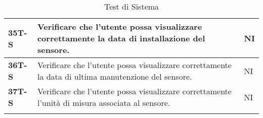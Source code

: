 \begin{longtable}{|>{\raggedright\arraybackslash}m{}|>{\raggedright\arraybackslash}m{}|>{\raggedright\arraybackslash}m{}|}
	\hline
	\textbf{35T-S}   & Verificare che l’utente possa visualizzare correttamente la data di installazione del sensore. & NI\\
	\hline
	\textbf{36T-S}   & Verificare che l’utente possa visualizzare correttamente la data di ultima manutenzione del sensore. & NI\\
	\hline
	\textbf{37T-S}   & Verificare che l’utente possa visualizzare correttamente l’unità di misura associata al sensore. & NI\\
	\hline
	\caption{Test di Sistema} %
	\label{table:14}
\end{longtable}

\newpage
